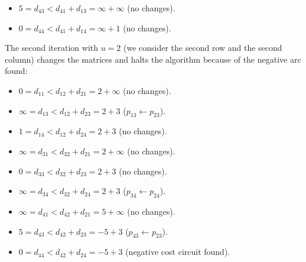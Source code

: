 \documentclass[12pt, a4paper]{report}
\begin{document}
\begin{example}
\begin{itemize}
            \item $5=d_{43} < d_{41} + d_{13} = \infty + \infty$ (no changes). 
            \item $0=d_{44} < d_{41} + d_{14} = \infty + 1$ (no changes). 
        \end{itemize}
        The second iteration with $u=2$ (we consider the second row and the second column) changes the matrices and halts the algorithm because of the negative arc found: 
        \begin{itemize}
            \item $0=d_{11} < d_{12} + d_{21} = 2 +\infty $ (no changes). 
            \item $\infty=d_{13} < d_{12} + d_{23} = 2+3$ ($p_{13} \leftarrow p_{23}$). 
            \item $1=d_{14} < d_{12} + d_{24} = 2+3$ (no changes). 
            \item $\infty=d_{31} < d_{32} + d_{21} = 2 + \infty$ (no changes). 
            \item $0=d_{33} < d_{32} + d_{23} = 2+3$ (no changes). 
            \item $\infty=d_{34} < d_{32} + d_{24} = 2+3$ ($p_{34} \leftarrow p_{24}$). 
            \item $\infty=d_{41} < d_{42} + d_{21} = 5 + \infty$ (no changes). 
            \item $5=d_{43} < d_{42} + d_{23} = -5+3$ ($p_{43} \leftarrow p_{23}$). 
            \item $0=d_{44} < d_{42} + d_{24} = -5+3$ (negative cost circuit found). 
        \end{itemize}
    \end{example}
\end{document}
